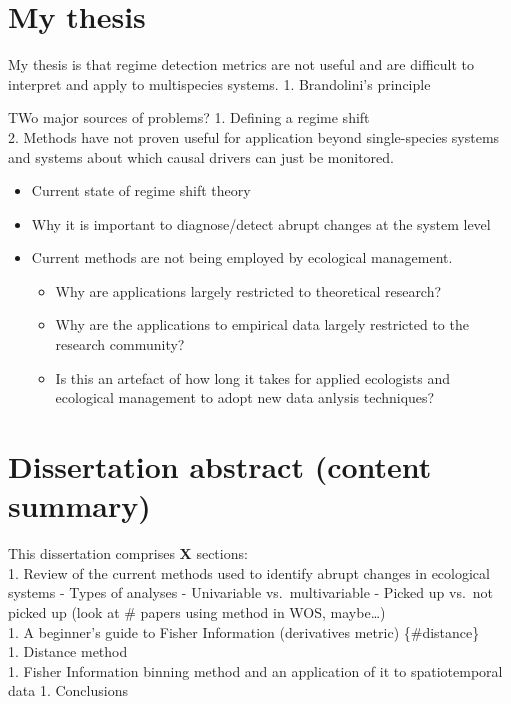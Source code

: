 \documentclass[12pt,twoside]{reedthesis}
\providecommand{\tightlist}{%
  \setlength{\itemsep}{0pt}\setlength{\parskip}{0pt}}
\begin{document}
\section{My thesis}\label{my-thesis}

My thesis is that regime detection metrics are not useful and are
difficult to interpret and apply to multispecies systems. 1.
Brandolini's principle

TWo major sources of problems? 1. Defining a regime shift\\
2. Methods have not proven useful for application beyond single-species
systems and systems about which causal drivers can just be monitored.
\begin{itemize}
\tightlist
\item
  Current state of regime shift theory
\item
  Why it is important to diagnose/detect abrupt changes at the system
  level
\item
  Current methods are not being employed by ecological management.
  \begin{itemize}
  \tightlist
  \item
    Why are applications largely restricted to theoretical research?
  \item
    Why are the applications to empirical data largely restricted to the
    research community?
  \item
    Is this an artefact of how long it takes for applied ecologists and
    ecological management to adopt new data anlysis techniques?
  \end{itemize}
\end{itemize}
\section{Dissertation abstract (content
summary)}\label{dissertation-abstract-content-summary}

This dissertation comprises \textbf{X} sections:\\
1. Review of the current methods used to identify abrupt changes in
ecological systems - Types of analyses - Univariable vs.~multivariable -
Picked up vs.~not picked up (look at \# papers using method in WOS,
maybe\ldots{})\\
1. A beginner's guide to Fisher Information (derivatives metric)
\{\#distance\}\\
1. Distance method\\
1. Fisher Information binning method and an application of it to
spatiotemporal data 1. Conclusions
\end{document}

